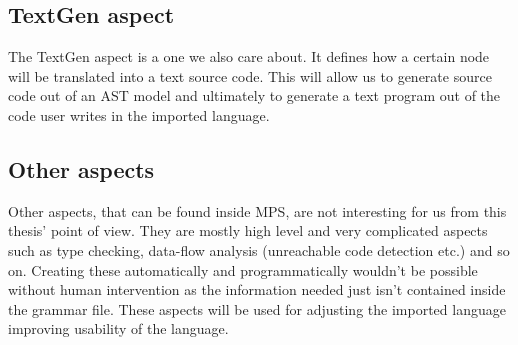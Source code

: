 \subsection{TextGen aspect}
The TextGen aspect is a one we also care about. It defines how a certain node will be translated into a text source code. This will allow us to generate source code out of an AST model and ultimately to generate a text program out of the code user writes in the imported language.

\subsection{Other aspects}
Other aspects, that can be found inside MPS, are not interesting for us from this thesis' point of view. They are mostly high level and very complicated aspects such as type checking, data-flow analysis (unreachable code detection etc.) and so on. Creating these automatically and programmatically wouldn't be possible without human intervention as the information needed just isn't contained inside the grammar file. These aspects will be used for adjusting the imported language improving usability of the language.